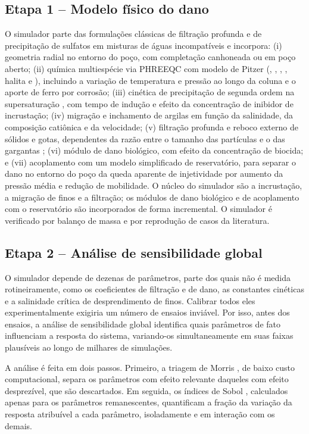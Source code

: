 \documentclass[10pt,a4paper]{article}
\begin{document}
\subsection{Etapa 1 -- Modelo físico do dano}
O simulador parte das formulações clássicas de filtração profunda
\cite{pangsharma1997,bedrikovetsky2001} e de precipitação de sulfatos em misturas de águas
incompatíveis \cite{bedrikovetsky2009} e incorpora:
(i) geometria radial no entorno do poço, com completação canhoneada ou em poço aberto;
(ii) química multiespécie via PHREEQC com modelo de Pitzer (, ,
, , halita e ), incluindo a variação de temperatura e
pressão ao longo da coluna e o aporte de ferro por corrosão; (iii) cinética de
precipitação de segunda ordem na supersaturação \cite{nancollas1975}, com tempo de
indução e efeito da concentração de inibidor de incrustação; (iv) migração e inchamento de argilas em função da salinidade, da composição
catiônica e da velocidade; (v) filtração profunda e reboco externo de sólidos e gotas,
dependentes da razão entre o tamanho das partículas e o das gargantas
\cite{pangsharma1997,bedrikovetsky2001}; (vi) módulo de dano biológico, com efeito da concentração de biocida; e (vii) acoplamento
com um modelo simplificado de reservatório, para separar o dano no entorno do poço da
queda aparente de injetividade por aumento da pressão média e redução de mobilidade.
O núcleo do simulador são a incrustação, a migração de finos e a filtração; os módulos de dano biológico e de acoplamento com o reservatório são incorporados de forma incremental. O simulador é verificado por balanço de massa e por reprodução de casos da literatura.

\subsection{Etapa 2 -- Análise de sensibilidade global}
O simulador depende de dezenas de parâmetros, parte dos quais não é medida rotineiramente,
como os coeficientes de filtração e de dano, as constantes cinéticas e a salinidade crítica
de desprendimento de finos. Calibrar todos eles experimentalmente exigiria um número de
ensaios inviável. Por isso, antes dos ensaios, a análise de sensibilidade global identifica
quais parâmetros de fato influenciam a resposta do sistema, variando-os simultaneamente em
suas faixas plausíveis ao longo de milhares de simulações.

A análise é feita em dois passos. Primeiro, a triagem de Morris \cite{morris1991}, de baixo
custo computacional, separa os parâmetros com efeito relevante daqueles com efeito
desprezível, que são descartados. Em seguida, os índices de Sobol \cite{sobol2001},
calculados apenas para os parâmetros remanescentes, quantificam a fração da variação da
resposta atribuível a cada parâmetro, isoladamente e em interação com os demais.
\end{document}
